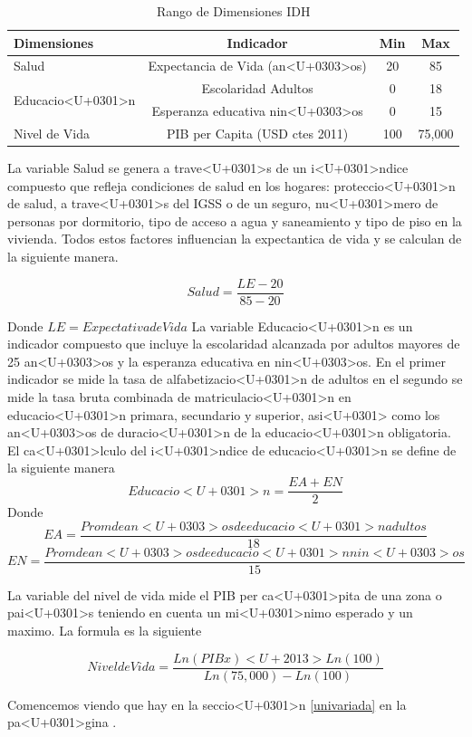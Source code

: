 \documentclass{article}
\begin{document}

\begin{table}[h!]
\centering
  \begin{tabular}{l c c c}
  \hline
  Dimensiones & Indicador & Min & Max \\ [0.25ex]
  \hline \hline
  Salud & Expectancia de Vida (an<U+0303>os) & 20 & 85 \\
  \multirow{2}{*}{Educacio<U+0301>n} & Escolaridad Adultos & 0 & 18 \\ 
   & Esperanza educativa nin<U+0303>os & 0 & 15 \\
  Nivel de Vida  & PIB per Capita (USD ctes 2011) & 100 & 75,000 \\
  \hline
  \end{tabular}
 \caption {Rango de Dimensiones IDH}
  \label{Tabla 1:}
\end {table} 

La variable Salud se genera a trave<U+0301>s de un i<U+0301>ndice compuesto que refleja condiciones de salud en los hogares: proteccio<U+0301>n de salud, a trave<U+0301>s del IGSS o de un seguro, nu<U+0301>mero de personas por dormitorio, tipo de acceso a agua y saneamiento y tipo de piso en la vivienda. Todos estos factores influencian la expectantica de vida y se calculan de la siguiente manera.

\[ Salud=\frac{LE-20} {85-20} \]

Donde $LE = Expectativa de Vida$
La variable Educacio<U+0301>n es un indicador compuesto que incluye la escolaridad alcanzada por adultos mayores de 25 an<U+0303>os y la esperanza educativa en nin<U+0303>os. En el primer indicador se mide la tasa de alfabetizacio<U+0301>n de adultos en el segundo se mide la tasa bruta combinada de matriculacio<U+0301>n en educacio<U+0301>n primara, secundario y superior, asi<U+0301> como los an<U+0303>os de duracio<U+0301>n de la educacio<U+0301>n obligatoria. El ca<U+0301>lculo del i<U+0301>ndice de educacio<U+0301>n se define de la siguiente manera
\[Educacio<U+0301>n= \frac{EA + EN} {2} \]
Donde
\[EA= \frac{Prom de an<U+0303>os de educacio<U+0301>n adultos} {18}  \]
\[EN= \frac{Prom de an<U+0303>os de educacio<U+0301>n nin<U+0303>os} {15}  \]

La variable del nivel de vida mide el PIB per ca<U+0301>pita de una zona o pai<U+0301>s teniendo en cuenta un mi<U+0301>nimo esperado y un maximo. La formula es la siguiente

\[Nivel de Vida = \frac {Ln(PIBx) <U+2013> Ln (100)} {Ln(75,000)-Ln(100)} \]





Comencemos viendo que hay en la seccio<U+0301>n \ref{univariada} en la pa<U+0301>gina \pageref{univariada}.

\clearpage







%
%
\end{document}

